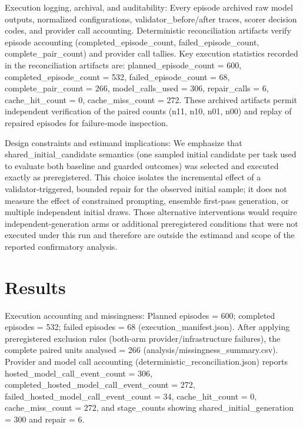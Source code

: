 \documentclass[conference]{IEEEtran}
\begin{document}
Execution logging, archival, and auditability: Every episode archived raw model outputs, normalized configurations, validator\_before/after traces, scorer decision codes, and provider call accounting. Deterministic reconciliation artifacts verify episode accounting (completed\_episode\_count, failed\_episode\_count, complete\_pair\_count) and provider call tallies. Key execution statistics recorded in the reconciliation artifacts are: planned\_episode\_count = 600, completed\_episode\_count = 532, failed\_episode\_count = 68, complete\_pair\_count = 266, model\_calls\_used = 306, repair\_calls = 6, cache\_hit\_count = 0, cache\_miss\_count = 272. These archived artifacts permit independent verification of the paired counts (n11, n10, n01, n00) and replay of repaired episodes for failure‑mode inspection.

Design constraints and estimand implications: We emphasize that shared\_initial\_candidate semantics (one sampled initial candidate per task used to evaluate both baseline and guarded outcomes) was selected and executed exactly as preregistered. This choice isolates the incremental effect of a validator‑triggered, bounded repair for the observed initial sample; it does not measure the effect of constrained prompting, ensemble first‑pass generation, or multiple independent initial draws. Those alternative interventions would require independent-generation arms or additional preregistered conditions that were not executed under this run and therefore are outside the estimand and scope of the reported confirmatory analysis.

\section{Results}
Execution accounting and missingness: Planned episodes = 600; completed episodes = 532; failed episodes = 68 (execution\_manifest.json). After applying preregistered exclusion rules (both‑arm provider/infrastructure failures), the complete paired units analysed = 266 (analysis/missingness\_summary.csv). Provider and model call accounting (deterministic\_reconciliation.json) reports hosted\_model\_call\_event\_count = 306, completed\_hosted\_model\_call\_event\_count = 272, failed\_hosted\_model\_call\_event\_count = 34, cache\_hit\_count = 0, cache\_miss\_count = 272, and stage\_counts showing shared\_initial\_generation = 300 and repair = 6.
\end{document}
